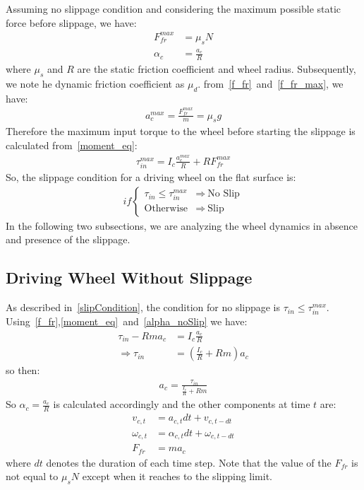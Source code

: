 \documentclass[letterpaper, 10pt, conference]{ieeeconf}
\begin{document}
Assuming no slippage condition and considering the maximum possible static force before slippage, we have:
\begin{align}
F_{fr}^{max} &= \mu_{s} N \label{f_fr_max} \\
\alpha_c &= \frac{a_c}{R} \label{alpha_noSlip}
\end{align}
where $\mu_s$ and $R$ are the static friction coefficient and wheel radius. Subsequently, we note he dynamic friction coefficient as $\mu_d$. from~\eqref{f_fr}~and~\eqref{f_fr_max}, we have:
\begin{align}
a_c^{max} = \frac{F_{fr}^{max}}{m} = \mu_s g
\end{align}
Therefore the maximum input torque to the wheel before starting the slippage is calculated from~\eqref{moment_eq}:
\begin{align}
\tau_{in}^{max} = I_c \frac{a_c^{max}}{R} + R F_{fr}^{max}
\end{align}
So, the slippage condition for a driving wheel on the flat surface is:
\begin{align}
if \begin{cases}
\tau_{in} \leqslant \tau_{in}^{max} &\Rightarrow \ \text{No Slip} \\
\text{Otherwise} &\Rightarrow \ \text{Slip}
\end{cases} \label{slipCondition}
\end{align}
In the following two subsections, we are analyzing the wheel dynamics in absence and presence of the slippage.
\subsection{Driving Wheel Without Slippage}
As described in~\eqref{slipCondition}, the condition for no slippage is $\tau_{in} \leqslant \tau_{in}^{max}$. Using~\eqref{f_fr},\eqref{moment_eq}~and~\eqref{alpha_noSlip} we have:
\begin{align*}
\tau_{in} - Rma_c &= I_c \frac{a_c}{R} \\
\Rightarrow \tau_{in} &= (\frac{I_c}{R} + Rm)a_c
\end{align*}
so then:
\begin{align}
a_c = \frac{\tau_{in}}{\frac{I_c}{R} + Rm}
\end{align}
So $\alpha_c = \frac{a_c}{R}$ is calculated accordingly and the other components at time $t$ are:
\begin{align}
v_{c,t} &= a_{c,t}dt + v_{c,t-dt} \label{linearVel}\\
\omega_{c,t} &= \alpha_{c,t}dt + \omega_{c,t-dt} \label{angularVel}\\
F_{fr} &= ma_c
\end{align}
where $dt$ denotes the duration of each time step. Note that the value of the $F_{fr}$ is not equal to $\mu_sN$ except when it reaches to the slipping limit.
\end{document}
